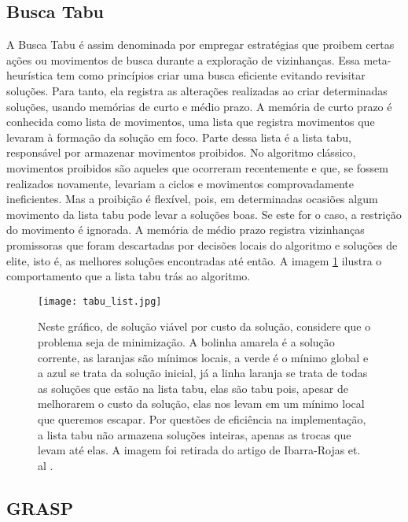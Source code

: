 \documentclass[12pt, a4paper]{article}
\begin{document}
\subsection{Busca Tabu}

A Busca Tabu é assim denominada por empregar estratégias que proibem certas ações ou movimentos de busca durante a exploração de vizinhanças. Essa meta-heurística tem como princípios criar uma busca eficiente evitando revisitar soluções. Para tanto, ela registra as alterações realizadas ao criar determinadas soluções, usando memórias de curto e médio prazo.  A memória de curto prazo é conhecida como lista de movimentos, uma lista que registra movimentos que levaram à formação da solução em foco. Parte dessa lista é a  lista tabu, responsável por armazenar movimentos proibidos. No algoritmo clássico, movimentos proibidos são aqueles que ocorreram recentemente e que, se fossem realizados novamente, levariam a ciclos e movimentos comprovadamente ineficientes. Mas a proibição é flexível, pois, em determinadas ocasiões algum movimento da lista tabu pode levar a soluções boas. Se este for o caso, a restrição do movimento é ignorada. A memória de médio prazo registra vizinhanças promissoras que foram descartadas por decisões locais do algoritmo e soluções de elite, isto é, as melhores soluções encontradas até então. A imagem \ref{fig:tabu} ilustra o comportamento que a lista tabu trás ao algoritmo.
%
\begin{figure}[htb!]
\centering
\texttt{[image: tabu\_list.jpg]}
\caption{Neste gráfico, de solução viável por custo da solução, considere que o problema seja de minimização. A bolinha amarela é a solução corrente, as laranjas são mínimos locais, a verde é o mínimo global e a azul se trata da solução inicial, já a linha laranja se trata de todas as soluções que estão na lista tabu, elas são tabu pois, apesar de melhorarem o custo da solução, elas nos levam em um mínimo local que queremos escapar. Por questões de eficiência na implementação, a lista tabu não armazena soluções inteiras, apenas as trocas que levam até elas. A imagem foi retirada do artigo de Ibarra-Rojas et. al \cite{ibarra2015planning}.}
\label{fig:tabu}
\end{figure}


\subsection{GRASP}
\end{document}
